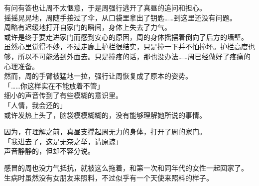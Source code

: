 有问有答也让周不太惬意，于是周强行逃开了真昼的追问和担心。\\

摇摇晃晃地，周随手接过了伞，从口袋里拿出了钥匙……到这里还没有问题。\\

周略有迟缓地打开自家门的瞬间，身体上失去了力气。\\

或许是终于要走进家门而感到安心的原因，周的身体摇摆着倒向了后方的墙壁。\\

虽然心里觉得不妙，不过走廊上护栏很结实，只是撞一下并不怕撞坏。护栏高度也够，所以不可能落到外面去。只是撞疼的话，那也没办法……周已经做好了疼痛的心理准备。\\

然而，周的手臂被猛地一拉，强行让周恢复成了原本的姿势。\\

「……你这样实在不能放着不管」\\

细小的声音传到了有些模糊的意识里。\\

「人情，我会还的」\\

或许发热上头了，脑袋模模糊糊的，没有能够理解她所说的事情。

因为，在理解之前，真昼支撑起周无力的身体，打开了周的家门。\\

「我进去了，这是无奈之举，请原谅」\\

声音静静的，但却不容分说。

感冒的周也没力气抵抗，就被这么拖着，和第一次和同年代的女性一起回家了。\\

生病时虽然没有女朋友来照料，不过似乎有一个天使来照料的样子。
